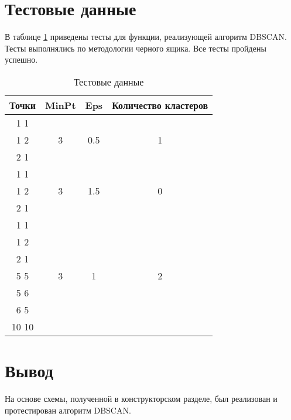 \section{Тестовые данные}

В таблице \ref{tbl:test} приведены тесты для функции, реализующей алгоритм DBSCAN.
Тесты выполнялись по методологии черного ящика.
Все тесты пройдены успешно.

\begin{table}[H]
	\begin{center}
		\caption{\label{tbl:test}Тестовые данные}
		\begin{tabular}{|c|c|c|c|}
			\hline
			\bfseries Точки & \bfseries MinPt & \bfseries Eps & \bfseries Количество кластеров  \\ 
			\hline

			1 1 & \multirow{3}{*}{3} & \multirow{3}{*}{0.5} & \multirow{3}{*}{1} \\
			1 2 & & & \\
			2 1 & & & \\ \hline

			1 1 & \multirow{3}{*}{3} & \multirow{3}{*}{1.5} & \multirow{3}{*}{0} \\
			1 2 & & & \\
			2 1 & & & \\ \hline

			1 1 & \multirow{7}{*}{3} & \multirow{7}{*}{1} & \multirow{7}{*}{2} \\
			1 2 & & & \\
			2 1 & & & \\
			5 5 & & & \\
			5 6 & & & \\
			6 5 & & & \\
			10 10 & & & \\ \hline

		\end{tabular}
	\end{center}
\end{table}

\section*{Вывод}

На основе схемы, полученной в конструкторском разделе, был реализован и протестирован алгоритм DBSCAN.
